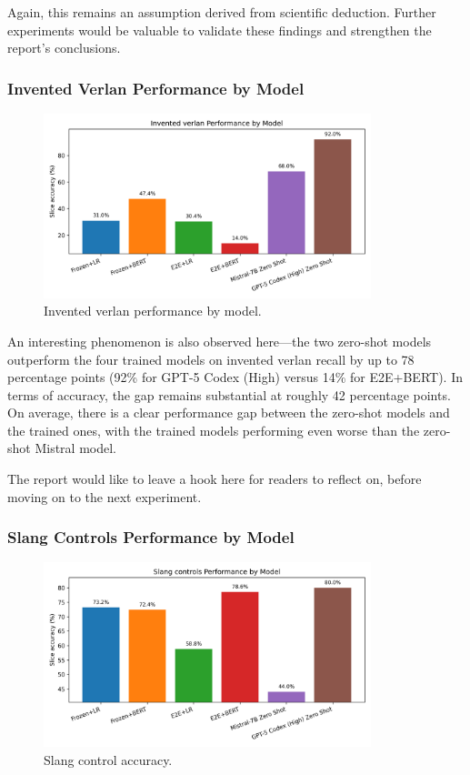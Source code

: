 \documentclass[12pt]{article}
\begin{document}
Again, this remains an assumption derived from scientific deduction. 
Further experiments would be valuable to validate these findings and strengthen the report's conclusions.

\subsubsection{Invented Verlan Performance by Model}

\begin{figure}[H]
    \centering
    \includegraphics[width=0.85\textwidth]{figures/invented_verlan_comparison.png}
    \caption{Invented verlan performance by model.}
    \label{fig:invented-verlan-comparison}
\end{figure}

An interesting phenomenon is also observed here\;---\;the two zero-shot models outperform the four trained models on invented verlan recall by up to 78 percentage points (92\% for GPT-5 Codex (High) versus 14\% for E2E+BERT). 
In terms of accuracy, the gap remains substantial at roughly 42 percentage points.
On average, there is a clear performance gap between the zero-shot models and the trained ones, with the trained models performing even worse than the zero-shot Mistral model.

The report would like to leave a hook here for readers to reflect on, before moving on to the next experiment.

\subsubsection{Slang Controls Performance by Model}

\begin{figure}[H]
    \centering
    \includegraphics[width=0.85\textwidth]{figures/slang_controls_comparison.png}
    \caption{Slang control accuracy.}
    \label{fig:slang-comparison}
\end{figure}
\end{document}
